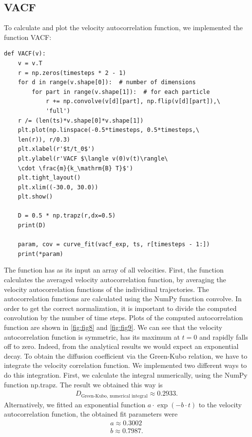 \documentclass[a4paper,10pt,bibtotoc]{scrartcl}
\begin{document}
\subsection{VACF}
To calculate and plot the velocity autocorrelation function, we implemented the function VACF:
\begin{lstlisting}
def VACF(v):
    v = v.T
    r = np.zeros(timesteps * 2 - 1)
    for d in range(v.shape[0]):  # number of dimensions
        for part in range(v.shape[1]):  # for each particle
            r += np.convolve(v[d][part], np.flip(v[d][part]),\
            'full')
    r /= (len(ts)*v.shape[0]*v.shape[1])
    plt.plot(np.linspace(-0.5*timesteps, 0.5*timesteps,\
    len(r)), r/0.3)
    plt.xlabel(r'$t/t_0$')
    plt.ylabel(r'VACF $\langle v(0)v(t)\rangle\
    \cdot \frac{m}{k_\mathrm{B} T}$')
    plt.tight_layout()
    plt.xlim((-30.0, 30.0))
    plt.show()

    D = 0.5 * np.trapz(r,dx=0.5)
    print(D)
    
    param, cov = curve_fit(vacf_exp, ts, r[timesteps - 1:])
    print(*param)
\end{lstlisting}
The function has as its input an array of all velocities.
First, the function calculates the averaged velocity autocorrelation function, by averaging the velocity autocorrelation functions of the individiual trajectories.
The autocorrelation functions are calculated using the NumPy function convolve. 
In order to get the correct normalization, it is important to divide the computed convolution by the number of time steps.
Plots of the computed autocorrelation function are shown in \autoref{fig:fig8} and \autoref{fig:fig9}.
We can see that the velocity autocorrelation function is symmetric, has its maximum at $t=0$ and rapidly falls off to zero.
Indeed, from the analytical results we would expect an exponential decay.
To obtain the diffusion coefficient via the Green-Kubo relation, we have to integrate the velocity correlation function.
We implemented two different ways to do this integration.
First, we calculate the integral numerically, using the NumPy function np.trapz. 
The result we obtained this way is
\begin{align}
D_\text{Green-Kubo, numerical integral} \approx 0.2933.
\end{align}
Alternatively, we fitted an exponential function $a\cdot \exp (-b\cdot t)$ to the velocity autocorrelation function, the obtained fit parameters were
\begin{align}
a \approx 0.3002\\
b \approx 0.7987.
\end{align}
\end{document}
